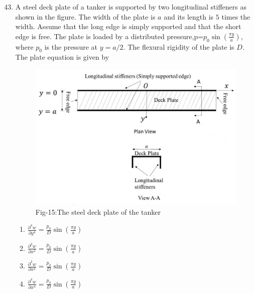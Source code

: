 \documentclass[journal]{IEEEtran}
\theoremstyle{remark}
\begin{document}
\begin{enumerate}[itemsep=1em]
\setcounter{enumi}{42}

\item A steel deck plate of a tanker is supported by two longitudinal stiffeners as shown in the figure. The width of the plate is $a$ and its length is $5$ times the width. Assume
that the long edge is simply supported and that the short edge is free. The plate is loaded by a distributed pressure,p=$p_0\sin(\frac{\pi y}{a})$, where $p_0$ is the pressure at $y=a/2$. The flexural rigidity of the plate is $D$. The plate equation is given by

\begin{figure}[H]
    \centering
    \includegraphics[width=0.5\columnwidth]{figs/fig-15.jpg}
    \caption*{Fig-15:The steel deck plate of the tanker}
    \label{fig-15}
\end{figure}
\begin{multicols}{4}
\begin{enumerate}
    \item $\frac{\partial^4 w}{\partial y^4} = \frac{p_0}{D} \sin\left( \frac{\pi y}{a} \right)$
    \item $\frac{\partial^2 w}{\partial x^2} = \frac{p_0}{D} \sin\left( \frac{\pi y}{a} \right)$
    \item $\frac{\partial^2 w}{\partial x^2} = \frac{p_0}{D} \sin\left( \frac{\pi y}{a} \right)$
    \item $\frac{\partial^4 w}{\partial x^4} = \frac{p_0}{D} \sin\left( \frac{\pi y}{a} \right)$

\end{enumerate}
\end{multicols}
\end{enumerate}

\newpage
\vspace*{0.25cm}
\end{document}

